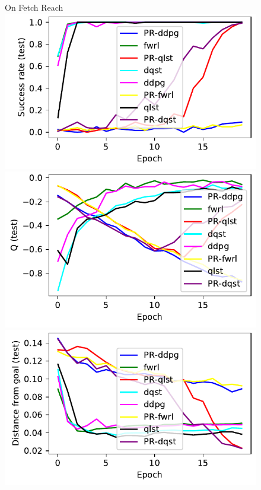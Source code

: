 %
\begin{figure}%
  \def\frac{0.24}
  On Fetch Reach\\
  \includegraphics[width=\frac\columnwidth]{media/res/245b3c4-ce781a70-FetchReachPR-v1-fwrl-future-her_fwrl_path_reward/test/success_rate.pdf}%
  \includegraphics[width=\frac\columnwidth]{media/res/245b3c4-ce781a70-FetchReachPR-v1-fwrl-future-her_fwrl_path_reward/test/mean_Q.pdf}%
  \includegraphics[width=\frac\columnwidth]{media/res/245b3c4-ce781a70-FetchReachPR-v1-fwrl-future-her_fwrl_path_reward/test/ag_g_dist.pdf}%

\end{figure}
